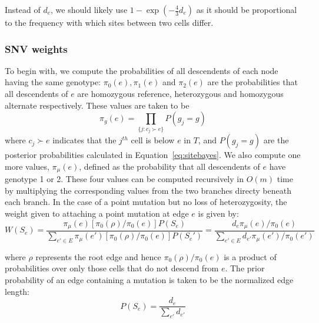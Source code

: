 \documentclass[../../main.tex]{subfiles}
\begin{document}
Instead of $d_e$, we should likely use $1-\exp (-\frac{4}{3} d_e)$ as it should be proportional to the frequency with which sites between two cells differ.
\subsubsection{SNV weights}
To begin with, we compute the probabilities of all descendents of each node having the same genotype: $\pi_0(e), \pi_1(e)$ and $\pi_2(e)$ are the probabilities that all descendents of $e$ are homozygous reference, heterozygous and homozygous alternate respectively. These values are taken to be
\begin{equation*}
\pi_g(e) = \prod_{\{j:c_j\succ e\}} P(g_j = g)
\end{equation*}
where $c_j\succ e$ indicates that the $j^{th}$ cell is below $e$ in $T$, and $P(g_j =g)$ are the posterior probabilities calculated in Equation~\eqref{eq:sitebayes}. We also compute one more values, $\pi_\mu(e)$, defined as the probability that all descendents of $e$ have genotype 1 or 2. These four values can be computed recursively in $O(m)$ time by multiplying the corresponding values from the two branches directy beneath each branch. In the case of a point mutation but no loss of heterozygosity, the weight given to attaching a point mutation at edge $e$ is given by:
\begin{equation} \label{eq:edgemutpost}
W(S_e) = \frac{\pi_\mu(e)\left[\pi_0(\rho)/\pi_0(e)\right]P(S_e)}{\sum_{e'\in E}\pi_\mu(e')\left[\pi_0(\rho)/\pi_0(e)\right]P(S_e')} = \frac{d_e\pi_\mu(e)/\pi_0(e)}{\sum_{e'\in E} d_{e'}\pi_\mu(e')/\pi_0(e')}
\end{equation}

where $\rho$ represents the root edge and hence $\pi_0(\rho)/\pi_0(e)$ is a product of probabilities over only those cells that do not descend from $e$. The prior probability of an edge containing a mutation is taken to be the normalized edge length:
\begin{equation*}
P(S_e) = \frac{d_e}{\sum_{e'} d_{e'}}
\end{equation*}
\end{document}
